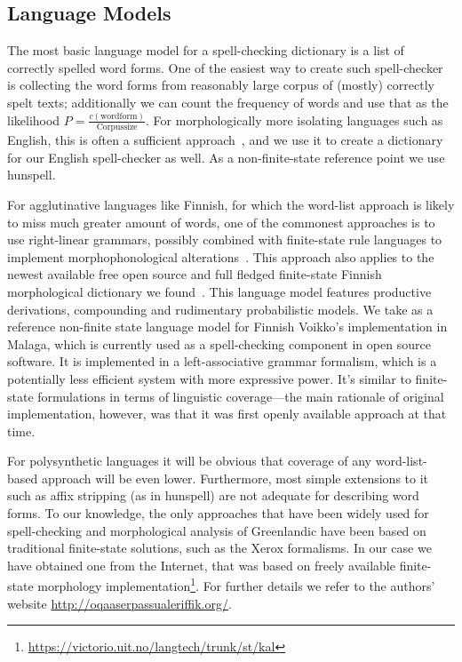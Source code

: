 \documentclass[11pt]{article}
\begin{document}
\subsection{Language Models}
\label{subsec:language-models}

The most basic language model for a spell-checking dictionary is a list of
correctly spelled word forms. One of the easiest way to create such 
spell-checker is collecting the word forms from reasonably large corpus of
(mostly) correctly spelt texts; additionally we can count the frequency of words
and use that as the likelihood $P=\frac{c(\mathrm{wordform})}{\mathrm{Corpus size}}$.
For morphologically more isolating languages such as English, this is
often a sufficient
approach~\cite{norvig/2010}, and we use it to create a dictionary
for our English
spell-checker as well. As a non-finite-state reference point we use
hunspell.

For agglutinative languages like Finnish, for which the word-list approach is
likely to miss much greater amount of words, one of the commonest approaches is
to use right-linear grammars, possibly combined with finite-state rule
languages to implement morphophonological alterations~\cite{koskenniemi/1983}.
This approach also applies to the newest available free open source and full
fledged finite-state Finnish morphological dictionary we
found~\cite{pirinen/2011/nodalida}. This language model features productive
derivations, compounding and rudimentary probabilistic models.  We take as a
reference non-finite state language model for Finnish Voikko's implementation
in Malaga, which is currently used as a spell-checking component in open source
software. It is implemented in a left-associative grammar formalism, which is a
potentially less efficient system with more expressive power. It's similar to
finite-state formulations in terms of linguistic coverage---the main rationale
of original implementation, however, was that it was first openly available
approach at that time.

For polysynthetic languages it will be obvious that coverage of any
word-list-based approach will be even lower. Furthermore, most simple
extensions to it such as affix stripping (as in hunspell) are not adequate for
describing word forms. To our knowledge, the only approaches that have been
widely used for spell-checking and morphological analysis of Greenlandic have
been based on traditional finite-state solutions, such as the Xerox formalisms.
In our case we have obtained one from the Internet, that was based on freely
available finite-state morphology
implementation\footnote{\url{https://victorio.uit.no/langtech/trunk/st/kal}}.
For further details we refer to the authors' website
\url{http://oqaaserpassualeriffik.org/}.
\end{document}
